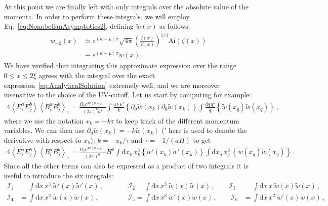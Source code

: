 At this point we are finally left with only integrals over the absolute value of the momenta. In order to perform these integrals, we will employ Eq.~\eqref{eq:NonabelianAsymptotics2}, defining $\tilde w(x)$ as follows:
\begin{align}
  w_{+2}(x) & \simeq e^{(\kappa-\mu)\pi}  \sqrt{4\pi} \left(\frac{\zeta(x)}{V(x)}\right)^{1/4}\mathrm{Ai}\left(\zeta(x)\right) \\
 &  \equiv e^{(\kappa-\mu)\pi} \tilde w(x) \,.
\end{align}
We have verified that integrating this approximate expression over the range $0 \leq x \leq 2 \xi$ agrees with the integral over the exact expression~\eqref{eq:AnalyticalSolution} extremely well, and we are moreover insensitive to the choice of the UV-cutoff. Let us start by computing for example:
\begin{equation}
\begin{aligned}
  4 \left \langle E^a_{i} E^b_{j} \right \rangle \left \langle B^a_{i} B^b_{j} \right \rangle_1   = \frac{\Omega_1 e^{4 \pi (\kappa - \mu)}}{(2 \pi)^6 a^8} \int  \frac{ \textrm{d} k  \, k^2 }{k} \left\{ \partial_0 \tilde w( x_k)  \partial_0 \tilde w( x_k)  \right \}      \int  \frac{\textrm{d} q  \, q^4}{ q} \left\{ \tilde w( x_q) \tilde w( x_q) \right \} \,,
\end{aligned}
\end{equation}
where we use the notation $x_k = - k \tau$ to keep track of the different momentum variables. We can then use $\partial_0 \tilde w( x_k)  = - k \tilde w( x_k)$ ($\prime$ here is used to denote the derivative with respect to $x_k$), $k = - x_k/ \tau$ and $\tau = - 1/(a H)$ to get
\begin{equation}
\begin{aligned}
  4 \left \langle E^a_{i} E^b_{j} \right \rangle \left \langle B^a_{i} B^b_{j} \right \rangle_1   = \frac{\Omega_1 e^{4 \pi (\kappa - \mu)}}{(2 \pi)^6} H^8 \int  \textrm{d} x_k  \, x_k^3  \left\{\tilde w'( x_k)  \tilde w'( x_k)   \right \}     \int \textrm{d} x_q  \, x_q^3 \ \left\{\tilde w( x_q)  \tilde w( x_q)   \right \}  \, .
\end{aligned}
\end{equation}
Since all the other terms can also be expressed as a product of two integrals it is useful to introduce the six integrals:
\begin{align}
  \mathcal{I}_1 & =  \int  \textrm{d} x  \, x^3 \  \tilde w'( x)  \tilde w'( x) \,, \qquad && 
  \mathcal{I}_2  =  \int  \textrm{d} x  \, x^3 \ \tilde w( x) \tilde w( x)  \,, \qquad 
  \mathcal{I}_3 & =  \int  \textrm{d} x  \, x \ \tilde w( x) \tilde w( x)  \,, \\ 
  \mathcal{I}_4 &  =  \int  \textrm{d} x  \, x^2 \ \tilde w( x) \tilde w( x) \,, \qquad &&
  \mathcal{I}_5  =  \int  \textrm{d} x  \, x^3 \ \tilde w'( x)  \tilde w( x) \,, \qquad 
  \mathcal{I}_6  &=  \int  \textrm{d} x  \, x^2 \  \tilde w'( x) \tilde w( x)   \,,
\end{align}
